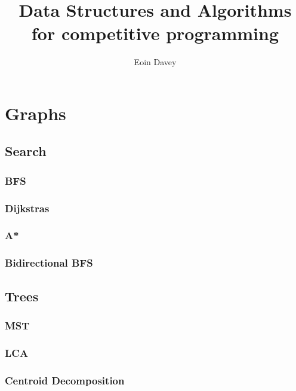 \documentclass[twocolumn]{article}
\begin{document}
    \title{Data Structures and Algorithms for competitive programming}
    \author{Eoin Davey}
    \maketitle
    \tableofcontents
    \newpage

    \section{Graphs}

    \subsection{Search}
        \subsubsection{BFS}
        
        \subsubsection{Dijkstras}
        
        \subsubsection{A*}
        
        \subsubsection{Bidirectional BFS}
        

    \subsection{Trees}
        \subsubsection{MST}
        
        \subsubsection{LCA}
        
        \subsubsection{Centroid Decomposition}
        
\end{document}
